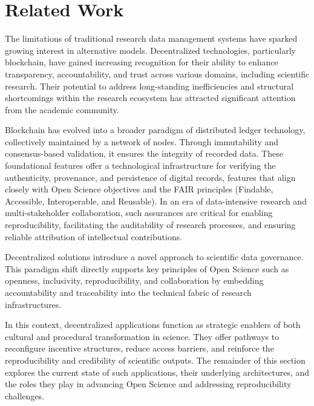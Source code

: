 \documentclass[final]{rc-book-2.14}
\begin{document}
\section{Related Work}
\label{chp:review:sec:rel_work}

The limitations of traditional research data management systems have sparked growing interest in alternative models. Decentralized technologies, particularly blockchain, have gained increasing recognition for their ability to enhance transparency, accountability, and trust across various domains, including scientific research. Their potential to address long-standing inefficiencies and structural shortcomings within the research ecosystem has attracted significant attention from the academic community.

Blockchain has evolved into a broader paradigm of distributed ledger technology, collectively maintained by a network of nodes. Through immutability and consensus-based validation, it ensures the integrity of recorded data. These foundational features offer a technological infrastructure for verifying the authenticity, provenance, and persistence of digital records, features that align closely with Open Science objectives and the FAIR principles (Findable, Accessible, Interoperable, and Reusable). In an era of data-intensive research and multi-stakeholder collaboration, such assurances are critical for enabling reproducibility, facilitating the auditability of research processes, and ensuring reliable attribution of intellectual contributions.

Decentralized solutions introduce a novel approach to scientific data governance. This paradigm shift directly supports key principles of Open Science such as openness, inclusivity, reproducibility, and collaboration by embedding accountability and traceability into the technical fabric of research infrastructures.

In this context, decentralized applications function as strategic enablers of both cultural and procedural transformation in science. They offer pathways to reconfigure incentive structures, reduce access barriers, and reinforce the reproducibility and credibility of scientific outputs. The remainder of this section explores the current state of such applications, their underlying architectures, and the roles they play in advancing Open Science and addressing reproducibility challenges.
\end{document}
